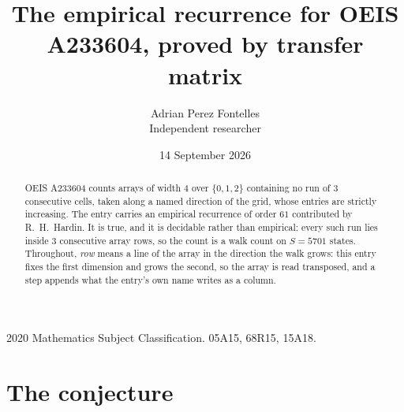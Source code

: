 \documentclass[11pt,a4paper]{article}
\title{The empirical recurrence for OEIS A233604, proved by transfer matrix}
\author{Adrian Perez Fontelles\\ \small Independent researcher}
\date{14 September 2026}
\theoremstyle{plain}
\theoremstyle{definition}
\begin{document}
\maketitle

\begin{abstract}
OEIS A233604 counts arrays of width $4$ over $\{0,1,2\}$ containing no run of $3$ consecutive
cells, taken along a named direction of the grid, whose entries are strictly increasing. The entry carries
an empirical recurrence of order $61$ contributed by R.~H.~Hardin. It is true, and it is
decidable rather than empirical: every such run lies inside $3$ consecutive array rows, so
the count is a walk count on $S=5701$ states.
 Throughout, \emph{row} means a line of the array in the direction the walk grows: this entry fixes the first dimension and grows the second, so the array is read transposed, and a step appends what the entry's own name writes as a column.\end{abstract}

\noindent\small 2020 Mathematics Subject Classification. 05A15, 68R15, 15A18.\normalsize

\section{The conjecture}
\end{document}
